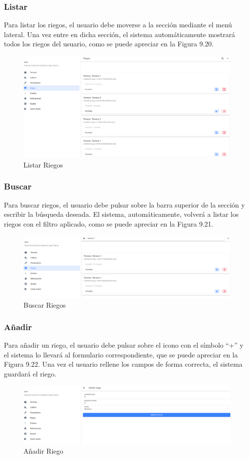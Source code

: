 \subsubsection{Listar}
Para listar los riegos, el usuario debe moverse a la sección mediante el menú lateral. Una vez entre en dicha sección, el sistema automáticamente mostrará todos los riegos del usuario, como se puede apreciar en la Figura 9.20.
\begin{figure}[H]
    \centering
    \includegraphics[width=0.7\linewidth]{images/user-manual/irrigate/list.png}
    \caption{Listar Riegos}
\end{figure}

\subsubsection{Buscar}
Para buscar riegos, el usuario debe pulsar sobre la barra superior de la sección y escribir la búsqueda deseada. El sistema, automáticamente, volverá a listar los riegos con el filtro aplicado, como se puede apreciar en la Figura 9.21.
\begin{figure}[H]
    \centering
    \includegraphics[width=0.7\linewidth]{images/user-manual/irrigate/search.png}
    \caption{Buscar Riegos}
\end{figure}

\subsubsection{Añadir}
Para añadir un riego, el usuario debe pulsar sobre el icono con el símbolo ``+'' y el sistema lo llevará al formulario correspondiente, que se puede apreciar en la Figura 9.22. Una vez el usuario rellene los campos de forma correcta, el sistema guardará el riego.
\begin{figure}[H]
    \centering
    \includegraphics[width=0.7\linewidth]{images/user-manual/irrigate/create.png}
    \caption{Añadir Riego}
\end{figure}

